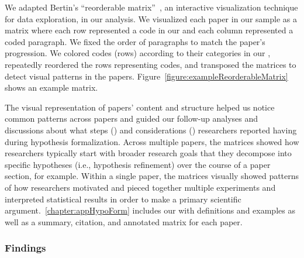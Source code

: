 \figureExampleReorderableMatrix

We adapted Bertin's ``reorderable matrix''~\cite{bertin2011graphics}, an
interactive visualization technique for data exploration, in our analysis. We
visualized each paper in our sample as a matrix where each row represented a
code in our \codebook and each column represented a coded paragraph. We fixed the
order of paragraphs to match the paper's progression. We colored codes (rows)
according to their categories in our \codebook, repeatedly reordered the rows
representing codes, and transposed the matrices to detect visual patterns in the
papers. Figure~\ref{figure:exampleReorderableMatrix} shows an example matrix. 

The visual representation of papers' content and structure helped us notice
common patterns across papers and guided our follow-up analyses and discussions
about what steps (\rqSteps) and considerations (\rqProcess) researchers reported
having during hypothesis formalization. Across multiple papers, the matrices
showed how researchers typically start with broader research goals that they
decompose into specific hypotheses (i.e., hypothesis refinement) over the course
of a paper section, for example. Within a single paper, the matrices visually
showed patterns of how researchers motivated and pieced together multiple
experiments and interpreted statistical results in order to make a primary
scientific argument.~\autoref{chapter:appHypoForm} includes our \codebook with
definitions and examples as well as a summary, citation, and annotated matrix
for each paper.



\subsubsection{Findings}

